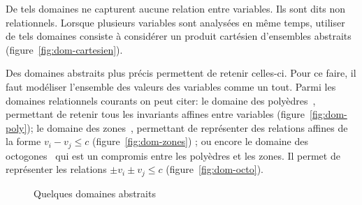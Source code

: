 De tels domaines ne capturent aucune relation entre variables. Ils sont dits non
relationnels. Lorsque plusieurs variables sont analysées en même temps, utiliser
de tels domaines consiste à considérer un produit cartésien d'ensembles
abstraits (figure~\ref{fig:dom-cartesien}).

Des domaines abstraits plus précis permettent de retenir celles-ci. Pour ce
faire, il faut modéliser l'ensemble des valeurs des variables comme un tout.
Parmi les domaines relationnels courants on peut citer: le domaine des
polyèdres~\cite{CousotHalbwachs78}, permettant de retenir tous les invariants
affines entre variables (figure~\ref{fig:dom-poly}); le domaine des
zones~\cite{mineZones}, permettant de représenter des relations affines de la
forme $v_i - v_j \le c$ (figure~\ref{fig:dom-zones}) ; ou encore le domaine des
octogones~\cite{mineOctagons} qui est un compromis entre les polyèdres et les
zones. Il permet de représenter les relations $\pm v_i \pm v_j \le c$
(figure~\ref{fig:dom-octo}).

\begin{figure}[h]%

  \centering

  \subbottom[Domaine des polyèdres]{%
\label{fig:dom-poly}
%
    \begin{tikzpicture}[scale=0.5]
    \path[use as bounding box] (0,0) rectangle (8, 6);
%
    \draw[fill=red!30] (1,2) -- (2,4) -- (4,5) -- (6,5) -- (7,3) -- (5,1) -- cycle;
%
    \end{tikzpicture}
  }%

  \subbottom[Domaine des zones]{%
\label{fig:dom-zones}
%
    \begin{tikzpicture}
    \path[use as bounding box] (0,0) rectangle (4,4);
%
    \draw[fill=red!30] (1,2) -- (2,3) -- (3,3) -- (3,2) -- (2,1) -- (1,1) -- cycle;
%
    \end{tikzpicture}
  }%
  \subbottom[Domaine des octogones]{%
\label{fig:dom-octo}
%
    \begin{tikzpicture}
    \path[use as bounding box] (0,0) rectangle (4,4);
%
    \draw[fill=red!30] (1,1.5) -- (1,2) -- (2,3) -- (2.5,3) -- (3,2.5) -- (3,2) -- (2,1) -- (1.5,1) -- cycle;
%
    \end{tikzpicture}
  }%

  \caption{Quelques domaines abstraits}
\label{fig:dom-abstraits}
\end{figure}%

